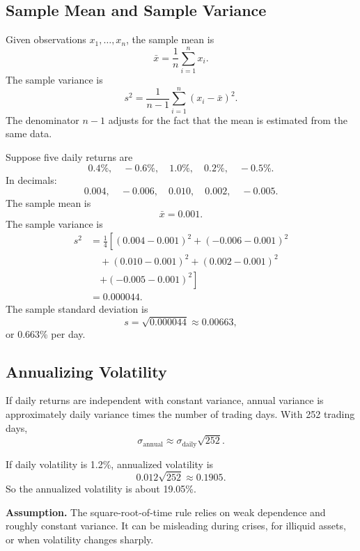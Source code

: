 \subsection{Sample Mean and Sample Variance}

Given observations $x_1,\ldots,x_n$, the sample mean is
\[
    \bar{x}=\frac{1}{n}\sum_{i=1}^{n}x_i.
\]
The sample variance is
\[
    s^2=\frac{1}{n-1}\sum_{i=1}^{n}(x_i-\bar{x})^2.
\]
The denominator $n-1$ adjusts for the fact that the mean is estimated from the
same data.

\begin{exmp}
Suppose five daily returns are
\[
    0.4\%,\quad -0.6\%,\quad 1.0\%,\quad 0.2\%,\quad -0.5\%.
\]
In decimals:
\[
    0.004,\quad -0.006,\quad 0.010,\quad 0.002,\quad -0.005.
\]
The sample mean is
\[
    \bar{x}=0.001.
\]
The sample variance is
\[
\begin{aligned}
    s^2
    &=
    \frac{1}{4}\left[
    (0.004-0.001)^2+(-0.006-0.001)^2\right.\\
    &\quad
    +(0.010-0.001)^2+(0.002-0.001)^2\\
    &\quad
    \left.+(-0.005-0.001)^2
    \right]\\
    &=
    0.000044.
\end{aligned}
\]
The sample standard deviation is
\[
    s=\sqrt{0.000044}\approx 0.00663,
\]
or 0.663\% per day.
\end{exmp}

\subsection{Annualizing Volatility}

If daily returns are independent with constant variance, annual variance is
approximately daily variance times the number of trading days. With 252 trading
days,
\[
    \sigma_{\text{annual}} \approx \sigma_{\text{daily}}\sqrt{252}.
\]

\begin{exmp}
If daily volatility is 1.2\%, annualized volatility is
\[
    0.012\sqrt{252}\approx 0.1905.
\]
So the annualized volatility is about 19.05\%.
\end{exmp}

\begin{boxF}
\textbf{Assumption.} The square-root-of-time rule relies on weak dependence and
roughly constant variance. It can be misleading during crises, for illiquid
assets, or when volatility changes sharply.
\end{boxF}

